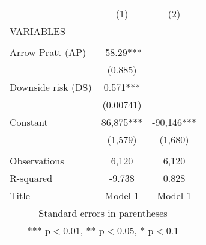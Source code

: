 \documentclass[]{article}
\begin{document}
\begin{tabular}{lcc} \hline
 & (1) & (2) \\
VARIABLES  \\ \hline
 &  &  \\
Arrow Pratt (AP) & -58.29*** &  \\
 & (0.885) &  \\
Downside risk (DS) & 0.571*** &  \\
 & (0.00741) &  \\
Constant & 86,875*** & -90,146*** \\
 & (1,579) & (1,680) \\
 &  &  \\
Observations & 6,120 & 6,120 \\
R-squared & -9.738 & 0.828 \\
 Title & Model 1 & Model 1 \\ \hline
\multicolumn{3}{c}{ Standard errors in parentheses} \\
\multicolumn{3}{c}{ *** p$<$0.01, ** p$<$0.05, * p$<$0.1} \\
\end{tabular}
\end{document}
